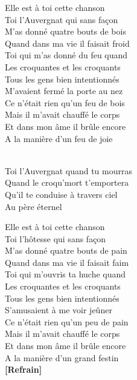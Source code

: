 \documentclass{novel}
\begin{document}
\begin{multicols}{2}
Elle est à toi cette chanson \\
Toi l'Auvergnat qui sans façon \\
M'as donné quatre bouts de bois \\
Quand dans ma vie il faisait froid \\
Toi qui m'as donné du feu quand \\
Les croquantes et les croquants \\
Tous les gens bien intentionnés \\
M'avaient fermé la porte au nez \\
Ce n'était rien qu'un feu de bois \\
Mais il m'avait chauffé le corps \\
Et dans mon âme il brûle encore \\
A la manière d'un feu de joie \\


\begin{bfseries}
[Refrain:]\\
Toi l'Auvergnat quand tu mourras \\
Quand le croqu'mort t'emportera \\
Qu'il te conduise à travers ciel \\
Au père éternel \\
\end{bfseries}

Elle est à toi cette chanson \\
Toi l'hôtesse qui sans façon \\
M'as donné quatre bouts de pain \\
Quand dans ma vie il faisait faim \\
Toi qui m'ouvris ta huche quand \\
Les croquantes et les croquants \\
Tous les gens bien intentionnés \\
S'amusaient à me voir jeûner \\
Ce n'était rien qu'un peu de pain \\
Mais il m'avait chauffé le corps \\
Et dans mon âme il brûle encore \\
A la manière d'un grand festin \\

\textbf{[Refrain]}\\


\end{multicols}
\end{document}
